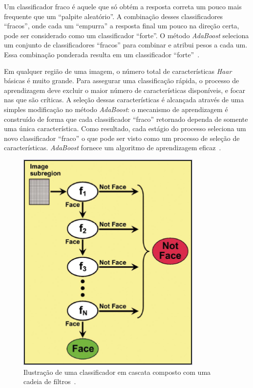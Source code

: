 Um classificador fraco é aquele que só obtém a resposta correta um pouco mais frequente que um ``palpite aleatório''. A combinação desses classificadores ``fracos'', onde cada um ``empurra'' a resposta final um pouco na direção certa, pode ser considerado como um classificador ``forte''. O método \textit{AdaBoost} seleciona um conjunto de classificadores ``fracos'' para combinar e atribui pesos a cada um. Essa combinação ponderada resulta em um classificador ``forte''~\cite{servodetection}.

Em qualquer região de uma imagem, o número total de características \textit{Haar} básicas é muito grande. Para assegurar uma classificação rápida, o processo de aprendizagem deve excluir o maior número de características disponíveis, e focar nas que são críticas. A seleção dessas características é alcançada através de uma simples modificação no método \textit{AdaBoost}: o mecanismo de aprendizagem é construído de forma que cada classificador ``fraco'' retornado dependa de somente uma única característica. Como resultado, cada estágio do processo seleciona um novo classificador ``fraco'' o que pode ser visto como um processo de seleção de características. \textit{AdaBoost} fornece um algoritmo de aprendizagem eficaz~\cite{violajones}.

	\begin{figure}[htb]
		\begin{center}
			\includegraphics[scale=5.0]{figuras/2.FundamentacaoTeorica/filterchain.png}
		\end{center}
		\caption{Ilustração de uma classificador em cascata composto com uma cadeia de filtros~\cite{servodetection}.}
		\label{filterchain}
	\end{figure}


